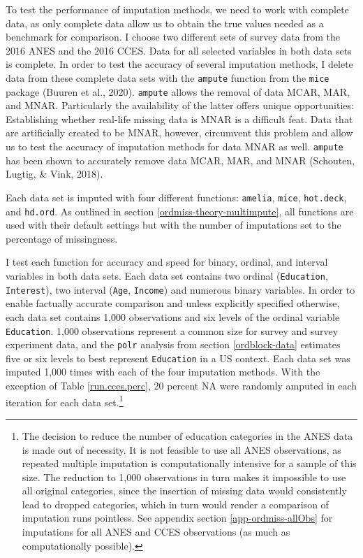 \documentclass[12pt,econ]{sources/authesis}
\begin{document}
To test the performance of imputation methods, we need to work with complete data, as only complete data allow us to obtain the true values needed as a benchmark for comparison. I choose two different sets of survey data from the 2016 ANES and the 2016 CCES. Data for all selected variables in both data sets is complete. In order to test the accuracy of several imputation methods, I delete data from these complete data sets with the \texttt{ampute} function from the \texttt{mice} package (Buuren et al., 2020). \texttt{ampute} allows the removal of data MCAR, MAR, and MNAR. Particularly the availability of the latter offers unique opportunities: Establishing whether real-life missing data is MNAR is a difficult feat. Data that are artificially created to be MNAR, however, circumvent this problem and allow us to test the accuracy of imputation methods for data MNAR as well. \texttt{ampute} has been shown to accurately remove data MCAR, MAR, and MNAR (Schouten, Lugtig, \& Vink, 2018).

Each data set is imputed with four different functions: \texttt{amelia}, \texttt{mice}, \texttt{hot.deck}, and \texttt{hd.ord}. As outlined in section \ref{ordmiss-theory-multimpute}, all functions are used with their default settings but with the number of imputations set to the percentage of missingness.

I test each function for accuracy and speed for binary, ordinal, and interval variables in both data sets. Each data set contains two ordinal (\texttt{Education}, \texttt{Interest}), two interval (\texttt{Age}, \texttt{Income}) and numerous binary variables. In order to enable factually accurate comparison and unless explicitly specified otherwise, each data set contains 1,000 observations and six levels of the ordinal variable \texttt{Education}. 1,000 observations represent a common size for survey and survey experiment data, and the \texttt{polr} analysis from section \ref{ordblock-data} estimates five or six levels to best represent \texttt{Education} in a US context. Each data set was imputed 1,000 times with each of the four imputation methods. With the exception of Table \ref{run.cces.perc}, 20 percent NA were randomly amputed in each iteration for each data set.\footnote{The decision to reduce the number of education categories in the ANES data is made out of necessity. It is not feasible to use all ANES observations, as repeated multiple imputation is computationally intensive for a sample of this size. The reduction to 1,000 observations in turn makes it impossible to use all original categories, since the insertion of missing data would consistently lead to dropped categories, which in turn would render a comparison of imputation runs pointless. See appendix section \ref{app-ordmiss-allObs} for imputations for all ANES and CCES observations (as much as computationally possible).}
\end{document}
